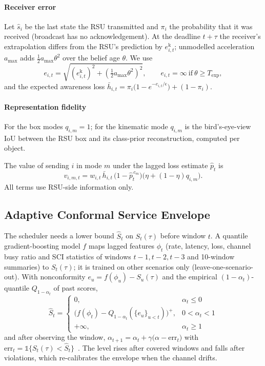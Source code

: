 \documentclass[journal]{IEEEtran}
\theoremstyle{remark}
\begin{document}
\paragraph*{Receiver error} Let $\hat s_i$ be the last state the RSU transmitted and $\pi_i$ the probability that it was received (broadcast has no acknowledgement). At the deadline $t+\tau$ the receiver's extrapolation differs from the RSU's prediction by $e^{\mathrm{k}}_{i,t}$; unmodelled acceleration $a_{\max}$ adds $\frac12 a_{\max}\theta^2$ over the belief age $\theta$. We use
\begin{equation}
e_{i,t}=\sqrt{(e^{\mathrm{k}}_{i,t})^2+(\tfrac12a_{\max}\theta^2)^2},\qquad e_{i,t}=\infty\ \text{if}\ \theta\ge T_{\exp},
\end{equation}
and the expected awareness loss $\bar h_{i,t}=\pi_i\big(1-e^{-e_{i,t}/\epsilon}\big)+(1-\pi_i)$.

\paragraph*{Representation fidelity} For the box modes $q_{i,m}=1$; for the kinematic mode $q_{i,m}$ is the bird's-eye-view IoU between the RSU box and its class-prior reconstruction, computed per object.

The value of sending $i$ in mode $m$ under the lagged loss estimate $\hat p_t$ is
\begin{equation}
v_{i,m,t}=w_{i,t}\,\bar h_{i,t}\,\big(1-\hat p_t^{\,c_m}\big)\big(\eta+(1-\eta)q_{i,m}\big). \label{eq:value}
\end{equation}
All terms use RSU-side information only.

\subsection{Adaptive Conformal Service Envelope}\label{sec:envelope}
The scheduler needs a lower bound $\hat S_t$ on $S_t(\tau)$ before window $t$. A quantile gradient-boosting model $f$ maps lagged features $\phi_t$ (rate, latency, loss, channel busy ratio and SCI statistics of windows $t-1,t-2,t-3$ and 10-window summaries) to $S_t(\tau)$; it is trained on other scenarios only (leave-one-scenario-out). With nonconformity $e_u=f(\phi_u)-S_u(\tau)$ and the empirical $(1-\alpha_t)$-quantile $Q_{1-\alpha_t}$ of past scores,
\begin{equation}
\hat S_t=\begin{cases}0,&\alpha_t\le0\\ \big(f(\phi_t)-Q_{1-\alpha_t}(\{e_u\}_{u<t})\big)^+,&0<\alpha_t<1\\ +\infty,&\alpha_t\ge1\end{cases} \label{eq:aci}
\end{equation}
and after observing the window, $\alpha_{t+1}=\alpha_t+\gamma\big(\alpha-\mathrm{err}_t\big)$ with $\mathrm{err}_t=\mathbb 1\{S_t(\tau)<\hat S_t\}$~\cite{gibbs2021aci}. The level rises after covered windows and falls after violations, which re-calibrates the envelope when the channel drifts.
\end{document}
